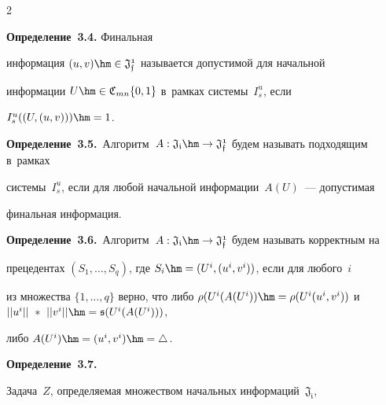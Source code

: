 \begin{multicols}{2}
\smallskip





\noindent


\textbf{Определение~3.4.}  Финальная 


информация $(u,v) \hm\in \mathfrak{J_{f}^1}$ называется допустимой для начальной 


информации $U \hm\in \mathfrak{C}_{mn}\{0,1\}$ в~рамках системы~$I_s^u$, если 


$I_s^u((U, (u,v)))\hm=1$.





\smallskip





\noindent


\textbf{Определение~3.5.}\ Алгоритм~$A: 


\mathfrak{J_i} \hm\rightarrow \mathfrak{J_f^1}$ будем называть подходящим в~рамках 


системы~$I_s^u$, если для любой начальной информации~$A(U)$~--- допустимая 


финальная информация.





\smallskip





\noindent


\textbf{Определение~3.6.}\ Алгоритм~$A: 


\mathfrak{J_i} \hm\rightarrow \mathfrak{J_f^1}$ будем называть корректным на 


прецедентах $(S_1,\ldots,S_q)$, где $S_i \hm= (U^i , (u^i, v^i))$, если для любого~$i$ 


из множества $\{1,\ldots,q\}$ верно, что либо $\rho(U^i(A(U^i)) \hm= 


\rho(U^i(u^i, v^i))$ и~$||u^i||~*~||v^i||\hm = \mathfrak{s}(U^i(A(U^i)))$, 


либо $A(U^i)\hm=(u^i,  v^i)\hm=\triangle$.





\smallskip





\noindent


\textbf{Определение~3.7.}\


Задача~$Z$, определяемая множеством начальных информаций~$\mathfrak{J_i}$, 



\end{multicols}
